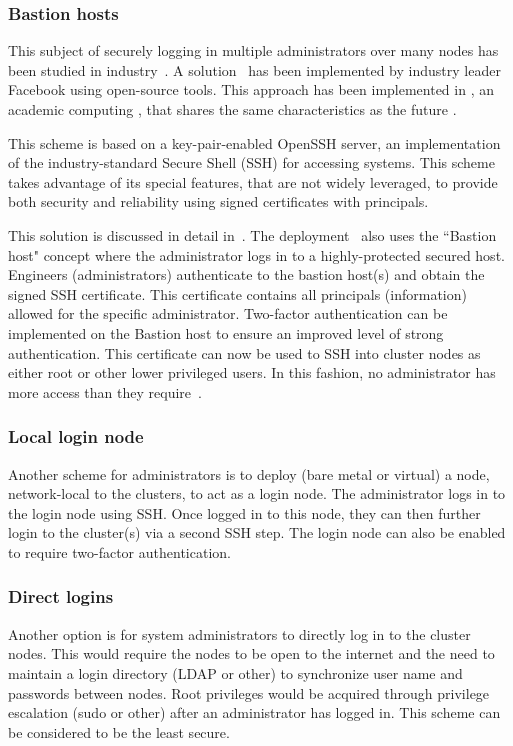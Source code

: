 \documentclass[12pt,a4paper]{article}
\begin{document}
\subsubsection{Bastion hosts}
\label{ssec:bastion}

This subject of securely logging in multiple administrators over many nodes has been studied in industry~\cite{secure-ssh}.
A solution~\cite{fb-ssh} has been implemented by industry leader Facebook using open-source tools.
This approach has been implemented in \nnt, an academic computing \einfra, that shares the same characteristics as the future \ED \einfra.

This scheme is based on a key-pair-enabled OpenSSH server, an implementation of the industry-standard Secure Shell (SSH) for accessing systems.
This scheme takes advantage of its special features, that are not widely leveraged, to provide both security and reliability using signed certificates with principals.

This solution is discussed in detail in~\cite{fb-ssh}.
The \nnt deployment~\cite{nt1-ssh} also uses the ``Bastion host" concept where the administrator logs in to a highly-protected secured host.
Engineers (administrators) authenticate to the bastion host(s) and obtain the signed SSH certificate.
This certificate contains all principals (information) allowed for the specific administrator. 
Two-factor authentication can be implemented on the Bastion host to ensure an improved level of strong authentication.
This certificate can now be used to SSH into cluster nodes as either root or other lower privileged users.
In this fashion, no administrator has more access than they require~\cite{privileges}.

\subsubsection{Local login node}
\label{ssec:local-login-node}

Another scheme for administrators is to deploy (bare metal or virtual) a node, network-local to the \ED clusters, to act as a login node.
The administrator logs in to the login node using SSH.
Once logged in to this node, they can then further login to the cluster(s) via a second SSH step.
The login node can also be enabled to require two-factor authentication.

\subsubsection{Direct logins}
\label{ssec:direct}
Another option is for system administrators to directly log in to the cluster nodes.
This would require the nodes to be open to the internet and the need to maintain a login directory (LDAP or other) to synchronize user name and passwords between nodes.
Root privileges would be acquired through privilege escalation (sudo or other) after an administrator has logged in.
This scheme can be considered to be the least secure.
\end{document}
